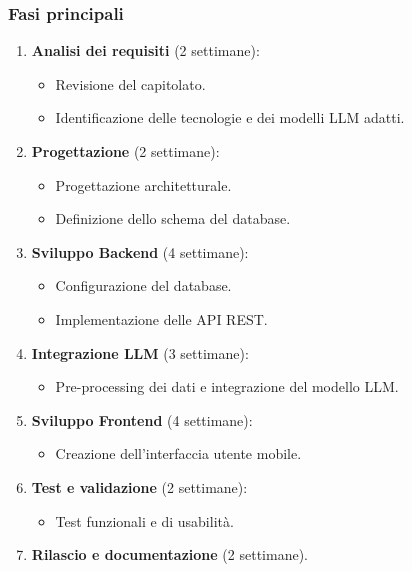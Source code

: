 \documentclass{article}
\begin{document}
        \subsubsection{Fasi principali}
        \begin{enumerate}
            \item \textbf{Analisi dei requisiti} (2 settimane):
            \begin{itemize}
                \item Revisione del capitolato.
                \item Identificazione delle tecnologie e dei modelli LLM adatti.
            \end{itemize}
            \item \textbf{Progettazione} (2 settimane):
            \begin{itemize}
                \item Progettazione architetturale.
                \item Definizione dello schema del database.
            \end{itemize}
            \item \textbf{Sviluppo Backend} (4 settimane):
            \begin{itemize}
                \item Configurazione del database.
                \item Implementazione delle API REST.
            \end{itemize}
            \item \textbf{Integrazione LLM} (3 settimane):
            \begin{itemize}
                \item Pre-processing dei dati e integrazione del modello LLM.
            \end{itemize}
            \item \textbf{Sviluppo Frontend} (4 settimane):
            \begin{itemize}
                \item Creazione dell'interfaccia utente mobile.
            \end{itemize}
            \item \textbf{Test e validazione} (2 settimane):
            \begin{itemize}
                \item Test funzionali e di usabilità.
            \end{itemize}
            \item \textbf{Rilascio e documentazione} (2 settimane).
        \end{enumerate}
\end{document}
